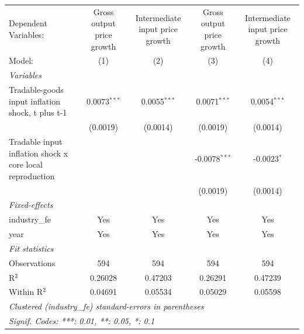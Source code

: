 \begingroup
\centering
\begin{tabular}{lcccc}
   \tabularnewline \midrule \midrule
   Dependent Variables:                                     & Gross output price growth & Intermediate input price growth & Gross output price growth & Intermediate input price growth\\  
   Model:                                                   & (1)                       & (2)                             & (3)                       & (4)\\  
   \midrule
   \emph{Variables}\\
   Tradable-goods input inflation shock, t plus t-1         & 0.0073$^{***}$            & 0.0055$^{***}$                  & 0.0071$^{***}$            & 0.0054$^{***}$\\   
                                                            & (0.0019)                  & (0.0014)                        & (0.0019)                  & (0.0014)\\   
   Tradable input inflation shock x core local reproduction &                           &                                 & -0.0078$^{***}$           & -0.0023$^{*}$\\   
                                                            &                           &                                 & (0.0019)                  & (0.0014)\\   
   \midrule
   \emph{Fixed-effects}\\
   industry\_fe                                             & Yes                       & Yes                             & Yes                       & Yes\\  
   year                                                     & Yes                       & Yes                             & Yes                       & Yes\\  
   \midrule
   \emph{Fit statistics}\\
   Observations                                             & 594                       & 594                             & 594                       & 594\\  
   R$^2$                                                    & 0.26028                   & 0.47203                         & 0.26291                   & 0.47239\\  
   Within R$^2$                                             & 0.04691                   & 0.05534                         & 0.05029                   & 0.05598\\  
   \midrule \midrule
   \multicolumn{5}{l}{\emph{Clustered (industry\_fe) standard-errors in parentheses}}\\
   \multicolumn{5}{l}{\emph{Signif. Codes: ***: 0.01, **: 0.05, *: 0.1}}\\
\end{tabular}
\par\endgroup
